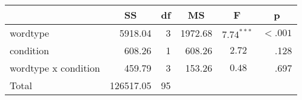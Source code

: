 \begin{center}
\begin{tabular}{lrrrrr}
\toprule
 & \multicolumn{1}{c}{\textbf{SS}} & \multicolumn{1}{c}{\textbf{df}} & \multicolumn{1}{c}{\textbf{MS}} & \multicolumn{1}{c}{\textbf{F}} & \multicolumn{1}{c}{\textbf{p}} \\
\midrule
wordtype & 5918.04 & 3 & 1972.68 & $7.74^{***}$ & $< .001$ \\
condition & 608.26 & 1 & 608.26 & $2.72^{   \ \ \ }$ & .128 \\
wordtype x condition & 459.79 & 3 & 153.26 & $0.48^{   \ \ \ }$ & .697 \\
\midrule
Total & 126517.05 & 95 \\
\bottomrule
\end{tabular}
\end{center}